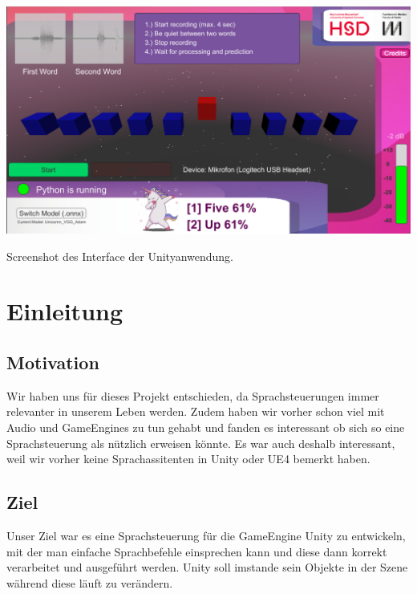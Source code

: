 \documentclass[sigconf]{acmart}
\begin{document}
\begin{teaserfigure}
  \includegraphics[width=\textwidth]{images/Demo}
  \caption{Screenshot des Interface der Unityanwendung.}
  \label{fig:UnityApp}
\end{teaserfigure}

\maketitle
\newpage
\section{Einleitung}

\subsection{Motivation}
Wir haben uns für dieses Projekt entschieden, da Sprachsteuerungen immer relevanter in unserem Leben werden. Zudem haben wir vorher schon viel mit Audio und GameEngines zu tun gehabt und fanden es interessant ob sich so eine Sprachsteuerung als nützlich erweisen könnte. Es war auch deshalb interessant, weil wir vorher keine Sprachassitenten in Unity oder UE4 bemerkt haben.

\subsection{Ziel}
Unser Ziel war es eine Sprachsteuerung für die GameEngine Unity zu entwickeln, mit der man einfache Sprachbefehle einsprechen kann und diese dann korrekt verarbeitet und ausgeführt werden. Unity soll imstande sein Objekte in der Szene während diese läuft zu verändern.
\end{document}
